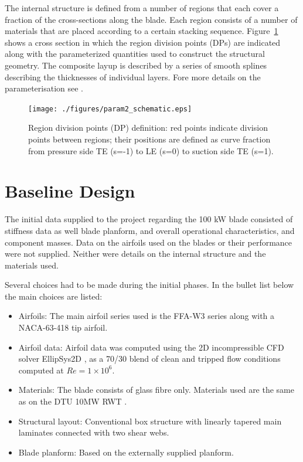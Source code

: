 The internal structure is defined from a number of regions that each cover a fraction of the cross-sections along the blade.
Each region consists of a number of materials that are placed according to a certain stacking sequence.
Figure~\ref{fig:cross_section_def} shows a cross section in which the region division points (DPs) are indicated along with the parameterized quantities used to construct the structural geometry.
The composite layup is described by a series of smooth splines describing the thicknesses of individual layers. 
Fore more details on the parameterisation see \cite{fusedwind}.

\begin{figure}[!ht]
\begin{center}
        \texttt{[image: ./figures/param2\_schematic.eps]}
\end{center}
\caption{Region division points (DP) definition: red points indicate division points between regions; their positions are defined as curve fraction from pressure side TE (s=-1) to LE (s=0) to suction side TE (s=1).}
\label{fig:cross_section_def}
\end{figure}

\section{Baseline Design}

The initial data supplied to the project regarding the 100 kW blade consisted of stiffness data as well blade planform, and overall operational characteristics, and component masses.
Data on the airfoils used on the blades or their performance were not supplied.
Neither were details on the internal structure and the materials used.

Several choices had to be made during the initial phases.
In the bullet list below the main choices are listed:

\begin{itemize}

	\item Airfoils: The main airfoil series used is the FFA-W3 series along with a NACA-63-418 tip airfoil.
	\item Airfoil data: Airfoil data was computed using the 2D incompressible CFD solver EllipSys2D \cite{michelsen92,michelsen94,sorensen95}, as a 70/30 blend of clean and tripped flow conditions computed at $Re=1\times10^6$.
	\item Materials: The blade consists of glass fibre only. Materials used are the same as on the DTU 10MW RWT \cite{bakrwt}.
	\item Structural layout: Conventional box structure with linearly tapered main laminates connected with two shear webs.
	\item Blade planform: Based on the externally supplied planform.
\end{itemize}


